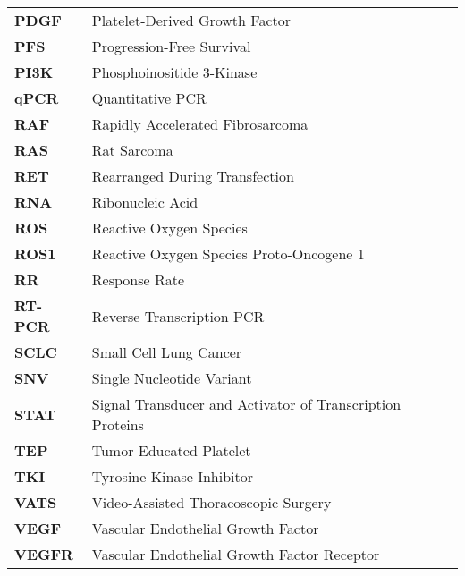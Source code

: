 \begin{longtable}[l]{l l}
    \textbf{PDGF} & Platelet-Derived Growth Factor \\
    \textbf{PFS} & Progression-Free Survival \\
    \textbf{PI3K} & Phosphoinositide 3-Kinase \\
    \textbf{qPCR} & Quantitative PCR \\
    \textbf{RAF} & Rapidly Accelerated Fibrosarcoma \\
    \textbf{RAS} & Rat Sarcoma \\
    \textbf{RET} & Rearranged During Transfection \\
    \textbf{RNA} & Ribonucleic Acid \\
    \textbf{ROS} & Reactive Oxygen Species \\
    \textbf{ROS1} & Reactive Oxygen Species Proto-Oncogene 1 \\
    \textbf{RR} & Response Rate \\
    \textbf{RT-PCR} & Reverse Transcription PCR \\
    \textbf{SCLC} & Small Cell Lung Cancer \\
    \textbf{SNV} & Single Nucleotide Variant \\
    \textbf{STAT} & Signal Transducer and Activator of Transcription Proteins \\
    \textbf{TEP} & Tumor-Educated Platelet \\
    \textbf{TKI} & Tyrosine Kinase Inhibitor \\
    \textbf{VATS} & Video-Assisted Thoracoscopic Surgery \\
    \textbf{VEGF} & Vascular Endothelial Growth Factor \\
    \textbf{VEGFR} & Vascular Endothelial Growth Factor Receptor \\
\end{longtable}

\normalsize
